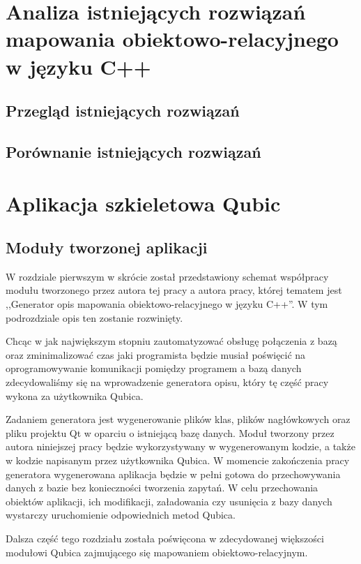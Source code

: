 \documentclass[12pt]{report}
\begin{document}
\chapter[Analiza istniejących rozwiązań]{Analiza istniejących rozwiązań mapowania obiektowo-relacyjnego w języku C++} \label{analiza}

\section{Przegląd istniejących rozwiązań}

\section{Porównanie istniejących rozwiązań}

\chapter{Aplikacja szkieletowa Qubic} \label{qubic}

\section{Moduły tworzonej aplikacji}

W rozdziale pierwszym w skrócie został przedstawiony schemat współpracy modułu tworzonego przez autora tej pracy a autora pracy, której tematem jest ,,Generator opis
mapowania obiektowo-relacyjnego w języku C++''. W tym podrozdziale opis ten zostanie rozwinięty.

Chcąc w jak największym stopniu zautomatyzować obsługę połączenia z bazą oraz zminimalizować czas jaki programista będzie musiał poświęcić na oprogra\-mowywanie
komunikacji pomiędzy programem a bazą danych zdecydowaliśmy się na wprowadzenie generatora opisu, który tę część pracy wykona za użytkownika Qubica.

Zadaniem generatora jest wygenerowanie plików klas, plików nagłówkowych oraz pliku projektu Qt w oparciu o istniejącą bazę danych. Moduł tworzony przez autora niniejszej
pracy będzie wykorzystywany w wygenerowanym kodzie, a także w kodzie napisanym przez użytkownika Qubica. W momencie zakończenia pracy generatora wygenerowana
aplikacja będzie w pełni gotowa do przechowywania danych z bazie bez konieczności tworzenia zapytań. W celu przechowania obiektów aplikacji, ich modifikacji, załadowania 
czy usunięcia z bazy danych wystarczy uruchomienie odpowiednich metod Qubica.

Dalsza część tego rozdziału została poświęcona w zdecydowanej większości modułowi Qubica zajmującego się mapowaniem obiektowo-relacyjnym.
\end{document}
